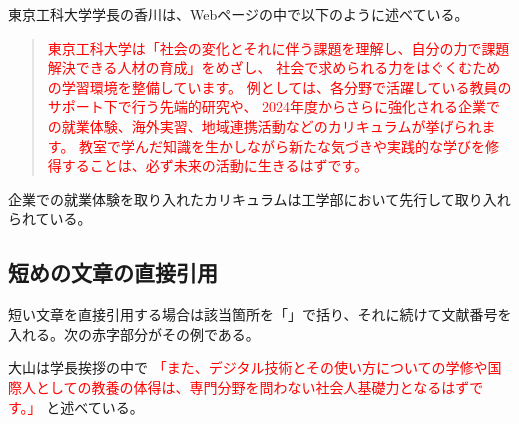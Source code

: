 

東京工科大学学長の香川は、Webページの中で以下のように述べている。

\begin{quotation}
    \textcolor{red}{
    東京工科大学は「社会の変化とそれに伴う課題を理解し、自分の力で課題解決できる人材の育成」をめざし、
    社会で求められる力をはぐくむための学習環境を整備しています。
    例としては、各分野で活躍している教員のサポート下で行う先端的研究や、
    2024年度からさらに強化される企業での就業体験、海外実習、地域連携活動などのカリキュラムが挙げられます。
    教室で学んだ知識を生かしながら新たな気づきや実践的な学びを修得することは、必ず未来の活動に生きるはずです。\cite{学長挨拶23:online}}
\end{quotation}

企業での就業体験を取り入れたカリキュラムは工学部において先行して取り入れられている。

\subsection{短めの文章の直接引用}

短い文章を直接引用する場合は該当箇所を「」で括り、それに続けて文献番号を入れる。次の赤字部分がその例である。

大山は学長挨拶の中で
\textcolor{red}{
 「また、デジタル技術とその使い方についての学修や国際人としての教養の体得は、専門分野を問わない社会人基礎力となるはずです。」\cite{学長挨拶23:online}}
と述べている。


